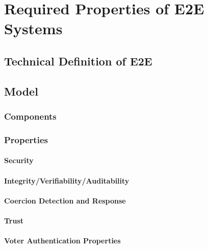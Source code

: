 \chapter{Required Properties of E2E Systems}

\section{Technical Definition of E2E}

\section{Model}

\subsection{Components}

\subsection{Properties}

\subsubsection{Security}
\subsubsection{Integrity/Verifiability/Auditability}
\subsubsection{Coercion Detection and Response}
\subsubsection{Trust}
\subsubsection{Voter Authentication Properties}